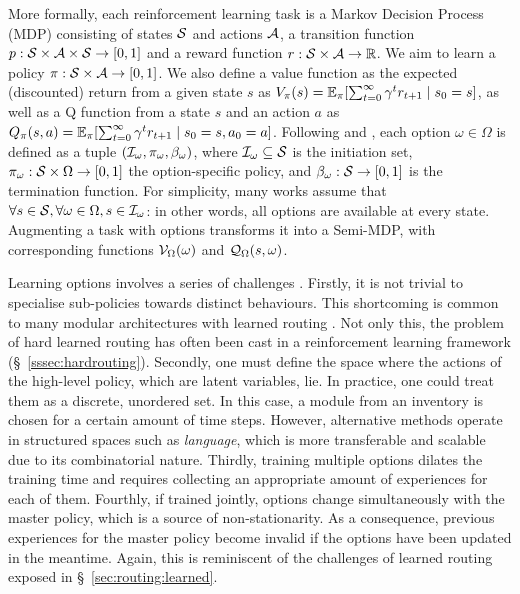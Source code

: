 \documentclass[10pt]{article} %
\begin{document}
More formally, each reinforcement learning task is a Markov Decision Process (MDP) consisting of states ${\mathcal{S}}$ and actions ${\mathcal{A}}$, a transition function $p : {\mathcal{S}} \times {\mathcal{A}} \times {\mathcal{S}} \rightarrow [0, 1]$ and a reward function $r : {\mathcal{S}} \times {\mathcal{A}} \rightarrow \mathbb{R}$. We aim to learn a policy $\pi : {\mathcal{S}} \times {\mathcal{A}} \rightarrow [0, 1]$. We also define a value function as the expected (discounted) return from a given state $s$  as $V_\pi(s) = \mathbb{E}_\pi [\sum_{t=0}^\infty \gamma^t r_{t+1} \mid s_0 = s] $, as well as a Q function from a state $s$ and an action $a$ as $Q_\pi(s, a) = \mathbb{E}_\pi [\sum_{t=0}^\infty \gamma^t r_{t+1} \mid s_0 = s, a_0 = a] $. Following \citet{sutton1999between} and \citet{precup2000temporal}, each option $\omega \in \Omega$ is defined as a tuple $({\mathcal{I}}_\omega, \pi_\omega, \beta_\omega)$, where ${\mathcal{I}}_\omega \subseteq {\mathcal{S}}$ is the initiation set, $\pi_\omega : {\mathcal{S}} \times \Omega \rightarrow [0, 1]$ the option-specific policy, and $\beta_\omega : {\mathcal{S}} \rightarrow [0, 1]$ is the termination function. For simplicity, many works assume that $\forall s \in {\mathcal{S}}, \forall \omega \in \Omega, s \in {\mathcal{I}}_\omega$: in other words, all options are available at every state. Augmenting a task with options transforms it into a Semi-MDP, with corresponding functions ${\mathcal{V}}_\Omega(\omega)$ and ${\mathcal{Q}}_\Omega(s, \omega)$. 

Learning options involves a series of challenges \citep{jiang2019language}. Firstly, it is not trivial to specialise sub-policies towards distinct behaviours. This shortcoming is common to many modular architectures with learned routing \citep[see \S~\ref{sec:routing:learned}]{mittal2022is}. Not only this, the problem of hard learned routing has often been cast in a reinforcement learning framework (\S~\ref{sssec:hardrouting}).
Secondly, one must define the space where the actions of the high-level policy, which are latent variables, lie. In practice, one could treat them as a discrete, unordered set. In this case, a module from an inventory is chosen for a certain amount of time steps. However, alternative methods operate in structured spaces such as \textit{language}, which is more transferable and scalable due to its combinatorial nature. Thirdly, training multiple options dilates the training time and requires collecting an appropriate amount of experiences for each of them. Fourthly, if trained jointly, options change simultaneously with the master policy, which is a source of non-stationarity. As a consequence, previous experiences for the master policy become invalid if the options have been updated in the meantime. Again, this is reminiscent of the challenges of learned routing exposed in \S~\ref{sec:routing:learned}.
\end{document}

